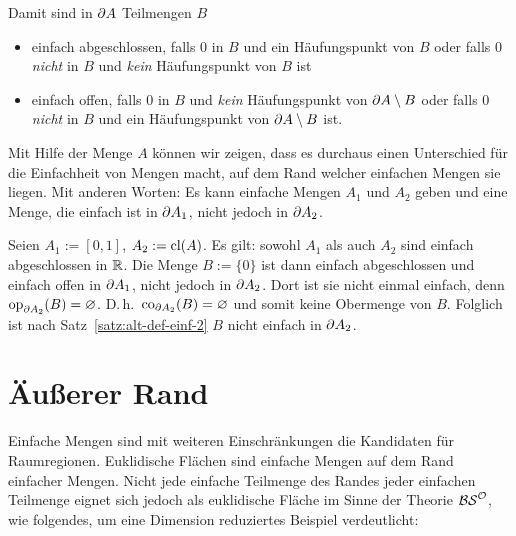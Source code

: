     \noindent
    Damit sind in $\partial A$ Teilmengen $B$
    \begin{itemize}
        \item einfach abgeschlossen, falls $0$ in $B$ und ein Häufungspunkt von $B$ oder falls $0$ \textit{nicht} in $B$ und \textit{kein} Häufungspunkt von $B$ ist
        \item einfach offen, falls $0$ in $B$ und \textit{kein} Häufungspunkt von $\partial A \setminus B$ oder falls $0$ \textit{nicht} in $B$ und ein Häufungspunkt von $\partial A \setminus B$ ist.
    \end{itemize}
    
    \noindent
    Mit
    Hilfe der Menge $A$ können wir zeigen, dass es durchaus einen Unterschied für die Einfachheit von Mengen macht, auf dem Rand welcher einfachen Mengen sie liegen.
    Mit anderen Worten: Es kann einfache Mengen $A_1$ und $A_2$ geben und eine Menge, die einfach ist in $\partial A_1$, nicht jedoch in $\partial A_2$.

    \begin{bsp}
         Seien $A_1 := [0,1]$, $A_2 := \text{cl}(A)$.
         Es gilt: sowohl $A_1$ als auch $A_2$ sind einfach abgeschlossen in $\mathbb{R}$. 
         Die Menge $B := \{0\}$ ist dann einfach abgeschlossen und einfach offen in $\partial A_1$, nicht jedoch in $\partial A_2$.
         Dort ist sie nicht einmal einfach, denn $\text{op}_{\partial A_2} (B) = \varnothing$. D.\,h.\ $\text{co}_{\partial A_2}(B) = \varnothing$ und somit keine Obermenge von $B$. Folglich ist nach Satz~\ref{satz:alt-def-einf-2} $B$ nicht einfach in $\partial A_2$.
    \end{bsp}

    
    
\section{Äußerer Rand}\label{sec:aeusserer-rand}

    Einfache
    Mengen sind mit weiteren Einschränkungen die Kandidaten für Raumregionen. Euklidische Flächen sind einfache Mengen auf dem Rand einfacher Mengen.
    Nicht jede einfache Teilmenge des Randes jeder einfachen Teilmenge eignet sich jedoch als euklidische Fläche im Sinne der Theorie $\mathcal{BS}^{\mathcal{O}}$, wie folgendes, um eine Dimension reduziertes Beispiel verdeutlicht:
    
